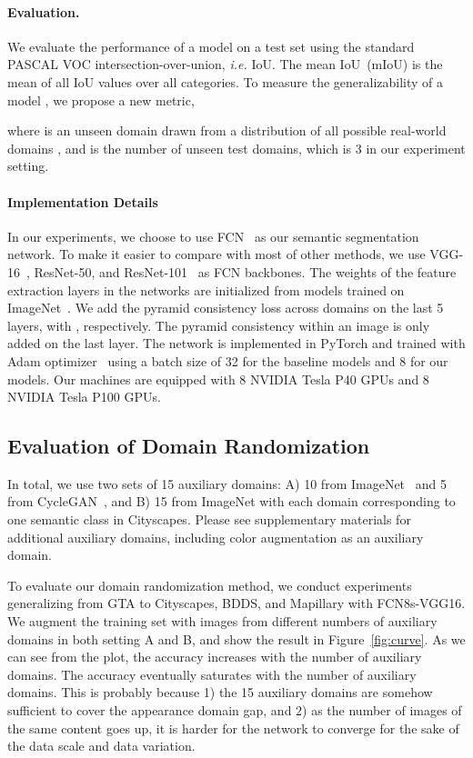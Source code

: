 \documentclass[10pt,twocolumn,letterpaper]{article}
\begin{document}
\paragraph{Evaluation.} We evaluate the performance of a model on a test set using the standard PASCAL VOC intersection-over-union, \textit{i.e.} IoU.
The mean IoU~(mIoU) is the mean of all IoU values over all categories. To measure the generalizability of a model , we propose a new metric,
\vspace{-1mm}
 

where  is an unseen domain drawn from a distribution of all possible real-world domains , and  is the number of unseen test domains, which is 3 in our experiment setting.

\paragraph{Implementation Details}
In our experiments, we choose to use FCN~\cite{long2015fully} as our semantic segmentation network. To make it easier to compare with most of other methods, we use VGG-16~\cite{vgg}, ResNet-50, and ResNet-101~\cite{he2016deep} as FCN backbones. The weights of the feature extraction layers in the networks are initialized from models trained on ImageNet~\cite{deng2009imagenet}. We add the pyramid consistency loss across domains on the last 5 layers, with , respectively. The pyramid consistency within an image is only added on the last layer. The network is implemented in PyTorch and trained with Adam optimizer~\cite{adam} using a batch size of 32 for the baseline models and 8 for our  models. Our machines are equipped with 8 NVIDIA Tesla P40 GPUs and 8 NVIDIA Tesla P100 GPUs.


\subsection{Evaluation of Domain Randomization}
\label{subsec:eval_domain_randomization}
In total, we use two sets of 15 auxiliary domains: A) 10 from ImageNet~\cite{deng2009imagenet} and 5 from CycleGAN~\cite{CycleGAN2017}, and B) 15 from ImageNet with each domain corresponding to one semantic class in Cityscapes. Please see supplementary materials for additional auxiliary domains, including color augmentation as an auxiliary domain.


To evaluate our domain randomization method, we conduct experiments generalizing from GTA to Cityscapes, BDDS, and Mapillary with FCN8s-VGG16. We augment the training set with images from different numbers of auxiliary domains in both setting A and B, and show the result in Figure~\ref{fig:curve}. As we can see from the plot, the accuracy increases with the number of auxiliary domains. The accuracy eventually saturates with the number of auxiliary domains. This is probably because 1) the 15 auxiliary domains are somehow sufficient to cover the appearance domain gap, and 2) as the number of images of the same content goes up, it is harder for the network to converge for the sake of the data scale and data variation. 
\end{document}
